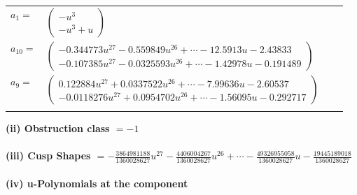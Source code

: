 \documentclass[1p]{elsarticle_modified}
\theoremstyle{definition}
\begin{document}
\begin{tabular}{m{7pt} m{180pt} m{7pt} m{180pt} }
\flushright $a_{1}=$&$\begin{pmatrix}- u^3\\- u^3+u\end{pmatrix}$ \\
\flushright $a_{10}=$&$\begin{pmatrix}-0.344773 u^{27}-0.559849 u^{26}+\cdots-12.5913 u-2.43833\\-0.107385 u^{27}-0.0325593 u^{26}+\cdots-1.42978 u-0.191489\end{pmatrix}$ \\
\flushright $a_{9}=$&$\begin{pmatrix}0.122884 u^{27}+0.0337522 u^{26}+\cdots-7.99636 u-2.60537\\-0.0118276 u^{27}+0.0954702 u^{26}+\cdots-1.56095 u-0.292717\end{pmatrix}$\\&\end{tabular}
\flushleft \textbf{(ii) Obstruction class $= -1$}\\~\\
\flushleft \textbf{(iii) Cusp Shapes $= -\frac{3864981188}{1360028627} u^{27}-\frac{4406004267}{1360028627} u^{26}+\cdots-\frac{49326955058}{1360028627} u-\frac{19445189018}{1360028627}$}\\~\\
\newpage\renewcommand{\arraystretch}{1}
\flushleft \textbf{(iv) u-Polynomials at the component}\newline \\
\end{document}
